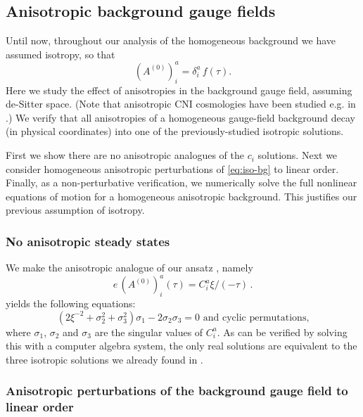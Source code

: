 \subsection{Anisotropic background gauge fields \label{subsec:Anisotropic-background-fields}}

Until now, throughout our analysis of the homogeneous background we have assumed isotropy, so that
\begin{equation}
(A^{(0)})_{i}^{a}=\delta_{i}^{a}\,f(\tau).\label{eq:iso-bg}
\end{equation}
 Here we study the effect of anisotropies in the background gauge field, assuming de-Sitter space. (Note that anisotropic CNI cosmologies have been studied e.g. in \cite{Maleknejad:2013npa}.) We verify that all anisotropies of a homogeneous gauge-field background decay (in physical coordinates) into one of the previously-studied isotropic solutions. 

First we show there are no anisotropic analogues of the $c_{i}$ solutions. Next we consider homogeneous anisotropic perturbations of \eqref{eq:iso-bg} to linear order. Finally, as a non-perturbative verification, we numerically solve the full nonlinear equations of motion for a homogeneous anisotropic background. This justifies our previous assumption of isotropy.

\subsubsection*{No anisotropic steady states }

We make the anisotropic analogue of our ansatz , namely 
\begin{equation}
e\,(A^{(0)})_{i}^{a}(\tau)=C_{i}^{a}\xi/(-\tau)\,.\label{eq:ansatz-aniso}
\end{equation}
 yields the following equations: 
\begin{equation}
(2\xi^{-2}+\sigma_{2}^{2}+\sigma_{3}^{2})\sigma_{1}-2\sigma_{2}\sigma_{3}=0\textrm{ and cyclic permutations,}\label{eq:svdansatz}
\end{equation}
where $\sigma_{1}$, $\sigma_{2}$ and $\sigma_{3}$ are the singular values of $C_{i}^{a}$. As can be verified by solving this with a computer algebra system, the only real solutions are equivalent to the three isotropic solutions we already found in .

\subsubsection*{Anisotropic perturbations of the background gauge field to linear order }

